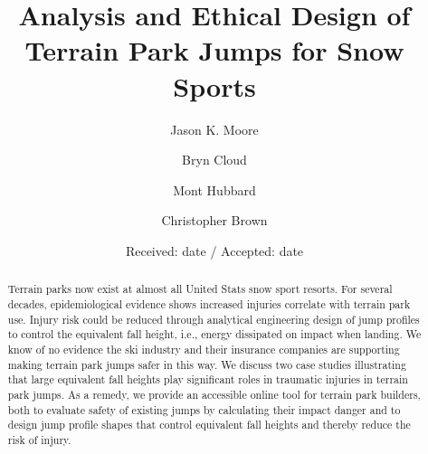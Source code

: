 \documentclass[smallextended]{svjour3}       %
\begin{document}
\title{Analysis and Ethical Design of Terrain Park Jumps for Snow Sports}

\author{Jason K. Moore      \and
        Bryn Cloud          \and
        Mont Hubbard        \and
        Christopher Brown
}



\date{Received: date / Accepted: date}

\maketitle

\begin{abstract}
  Terrain parks now exist at almost all United Stats snow sport resorts. For
  several decades, epidemiological evidence shows increased injuries correlate
  with terrain park use. Injury risk could be reduced through analytical
  engineering design of jump profiles to control the equivalent fall height,
  i.e., energy dissipated on impact when landing. We know of no evidence the
  ski industry and their insurance companies are supporting making terrain park
  jumps safer in this way. We discuss two case studies illustrating that large
  equivalent fall heights play significant roles in traumatic injuries in
  terrain park jumps. As a remedy, we provide an accessible online tool for
  terrain park builders, both to evaluate safety of existing jumps by
  calculating their impact danger and to design jump profile shapes that
  control equivalent fall heights and thereby reduce the risk of injury.
\end{abstract}
\end{document}
